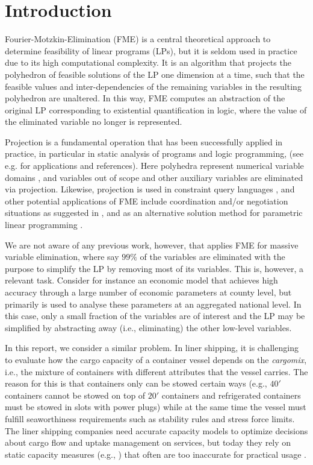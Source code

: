 \section{Introduction}

Fourier-Motzkin-Elimination (FME) is a central theoretical approach to determine feasibility of linear programs (LPs), but it is seldom used in practice due to its high computational complexity.
%
It is an algorithm that projects the polyhedron of feasible solutions of the LP one dimension at a time, such that the feasible values and inter-dependencies of the remaining variables in the resulting polyhedron are unaltered. In this way, FME computes an abstraction of the original LP corresponding to existential quantification in logic, {where the value of the eliminated variable no longer is represented.}

Projection is a fundamental operation that has been successfully applied in practice, in particular in static analysis of programs and logic programming,
(see e.g. \cite{benoy05} for applications and references). Here polyhedra represent 
numerical variable domains \cite{cousot78}, and variables out of scope and other auxiliary variables are eliminated via projection. Likewise, projection is used in constraint query languages \cite{lassez90}, and other potential applications of FME include coordination and/or negotiation situations as suggested in \cite{lukatskii08}, and as an alternative solution method for parametric linear programming \cite{jones08}.

We are not aware of any previous work, however, that applies FME for massive variable elimination, where say $99\%$ of the variables are eliminated with the purpose to simplify the LP by removing most of its variables. This is, however, a relevant task. Consider for instance an economic model that achieves high accuracy through a large number of economic parameters at county level, but primarily is used to analyse these parameters at an aggregated national level. In this case, only a small fraction of the variables are of interest and the LP may be simplified by abstracting away (i.e., eliminating) the other low-level variables.

In this report, we consider a similar problem. In liner shipping, it is challenging to evaluate how the cargo capacity of a container vessel depends on the {\em cargomix}, i.e., the mixture of containers with different attributes that the vessel carries. The reason for this is that containers only can be stowed certain ways (e.g., $40'$ containers cannot be stowed on top of $20'$ containers and refrigerated containers must be stowed in slots with power plugs) while at the same time the vessel must fulfill seaworthiness requirements such as stability rules and stress force limits. The liner shipping companies need accurate capacity models to optimize decisions about cargo flow and uptake management on services, but today they rely on static capacity measures (e.g., \cite{ting04,feng08,zurheide13}) that often are too inaccurate for practical usage \cite{AlbertosThesis}.

